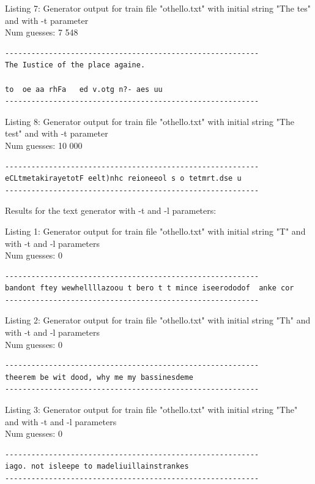 \documentclass{article}
\begin{document}
Listing 7: Generator output for train file "othello.txt" with initial string "The tes" and with -t parameter
\\Num guesses: 7 548

\begin{lstlisting}
----------------------------------------------------------
The Iustice of the place againe.

to  oe aa rhFa   ed v.otg n?- aes uu
----------------------------------------------------------
\end{lstlisting}

Listing 8: Generator output for train file "othello.txt" with initial string "The test" and with -t parameter
\\Num guesses: 10 000

\begin{lstlisting}
----------------------------------------------------------
eCLtmetakirayetotF eelt)nhc reioneeol s o tetmrt.dse u
----------------------------------------------------------
\end{lstlisting}


Results for the text generator with -t and -l parameters:


\hfill

Listing 1: Generator output for train file "othello.txt" with initial string "T" and with -t and -l parameters
\\Num guesses: 0

\begin{lstlisting}
----------------------------------------------------------
bandont ftey wewhellllazoou t bero t t mince iseerododof  anke cor
----------------------------------------------------------
\end{lstlisting}

Listing 2: Generator output for train file "othello.txt" with initial string "Th" and with -t and -l parameters
\\Num guesses: 0

\begin{lstlisting}
----------------------------------------------------------
theerem be wit dood, why me my bassinesdeme
----------------------------------------------------------
\end{lstlisting}

Listing 3: Generator output for train file "othello.txt" with initial string "The" and with -t and -l parameters
\\Num guesses: 0

\begin{lstlisting}
----------------------------------------------------------
iago. not isleepe to madeliuillainstrankes
----------------------------------------------------------
\end{lstlisting}
\end{document}
